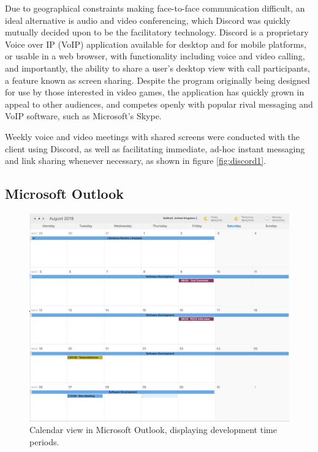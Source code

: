 Due to geographical constraints making face-to-face communication difficult, an ideal alternative is audio and video conferencing, which Discord was quickly mutually decided upon to be the facilitatory technology. Discord is a proprietary Voice over IP (VoIP) application available for desktop and for mobile platforms, or usable in a web browser, with functionality including voice and video calling, and importantly, the ability to share a user's desktop view with call participants, a feature known as screen sharing. \cite{Melcon1} Despite the program originally being designed for use by those interested in video games, the application has quickly grown in appeal to other audiences, and competes openly with popular rival messaging and VoIP software, such as Microsoft's Skype. \cite{Giret1}

Weekly voice and video meetings with shared screens were conducted with the client using Discord, as well as facilitating immediate, ad-hoc instant messaging and link sharing whenever necessary, as shown in figure \ref{fig:discord1}.

\subsection{Microsoft Outlook}
\begin{figure}[h]
    \includegraphics[width=\textwidth]{Figures/outlook}
    \caption{Calendar view in Microsoft Outlook, displaying development time periods.}
    \label{fig:outlook1}
\end{figure}

